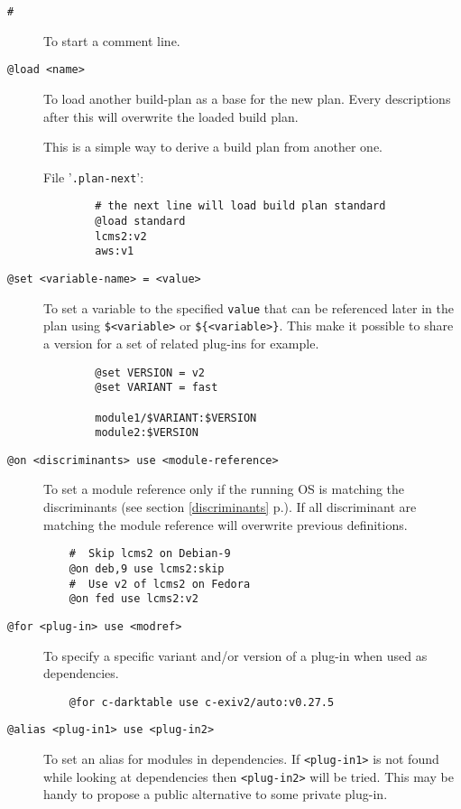\documentclass[a4paper,12pt,twoside]{article}
\newcommand{\code}[1]{\texttt{#1}}
\newcommand{\seeref}[1]{see section \ref{#1} p.\pageref{#1}}
\newcommand{\file}[1]{'{\texttt{#1}}'}
\begin{document}
\begin{description}
	\item[\code{\#}] To start a comment line.

	\item[\code{@load <name>}] To load another build-plan as a base for the new plan. Every descriptions after this will overwrite the loaded build plan.

	This is a simple way to derive a build plan from another one.

	File \file{.plan-next}:

	\begin{lstlisting}
		# the next line will load build plan standard
		@load standard
		lcms2:v2
		aws:v1
	\end{lstlisting}

	\item[\code{@set <variable-name> = <value>}] To set a variable to the specified \code{value} that can be referenced later in the plan using \code{\$<variable>} or \code{\$\{<variable>\}}. This make it possible to share a version for a set of related plug-ins for example.

	\begin{lstlisting}
		@set VERSION = v2
		@set VARIANT = fast

		module1/$VARIANT:$VERSION
		module2:$VERSION
	\end{lstlisting}

	\item[\code{@on <discriminants> use <module-reference>}] To set a module reference only if the running OS is matching the discriminants (\seeref{discriminants}). If all discriminant are matching the module reference will overwrite previous definitions.

	\begin{lstlisting}
	#  Skip lcms2 on Debian-9
	@on deb,9 use lcms2:skip
	#  Use v2 of lcms2 on Fedora
	@on fed use lcms2:v2
	\end{lstlisting}

	\item[\code{@for <plug-in> use <modref>}] To specify a specific variant and/or version of a plug-in when used as dependencies.
	\label{formodule}

    \begin{lstlisting}
	@for c-darktable use c-exiv2/auto:v0.27.5
    \end{lstlisting}

	\item[\code{@alias <plug-in1> use <plug-in2>}] To set an alias for modules in dependencies. If \code{<plug-in1>} is not found while looking at dependencies then \code{<plug-in2>} will be tried. This may be handy to propose a public alternative to some private plug-in.


\end{description}
\end{document}
